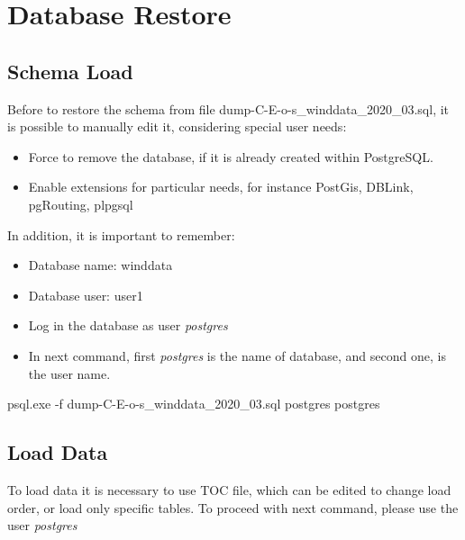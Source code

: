 \documentclass[12pt,oneside]{reedthesis}
\newenvironment{Shaded}{\begin{snugshade}}{\end{snugshade}}
\newcommand{\ExtensionTok}[1]{#1}
\newcommand{\NormalTok}[1]{#1}
\providecommand{\tightlist}{%
  \setlength{\itemsep}{0pt}\setlength{\parskip}{0pt}}
\begin{document}
\hypertarget{database-restore}{%
\section{Database Restore}\label{database-restore}}

\hypertarget{schema-load}{%
\subsection{Schema Load}\label{schema-load}}

Before to restore the schema from file dump-C-E-o-s\_winddata\_2020\_03.sql, it is possible to manually edit it, considering special user needs:
\begin{itemize}
\tightlist
\item
  Force to remove the database, if it is already created within PostgreSQL.
\item
  Enable extensions for particular needs, for instance PostGis, DBLink, pgRouting, plpgsql
\end{itemize}
In addition, it is important to remember:
\begin{itemize}
\tightlist
\item
  Database name: winddata
\item
  Database user: user1
\item
  Log in the database as user \emph{postgres}
\item
  In next command, first \emph{postgres} is the name of database, and second one, is the user name.
\end{itemize}
\scriptsize

\vspace{0.4cm}
\begin{Shaded}
\begin{Highlighting}[]
      \ExtensionTok{psql.exe}\NormalTok{ -f dump-C-E-o-s_winddata_2020_03.sql postgres postgres}
\end{Highlighting}
\end{Shaded}
\normalsize

\hypertarget{load-data}{%
\subsection{Load Data}\label{load-data}}

To load data it is necessary to use TOC file, which can be edited to change load order, or load only specific tables. To proceed with next command, please use the user \emph{postgres}
\end{document}
